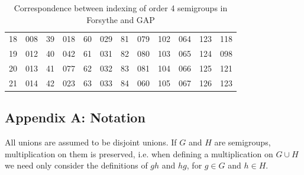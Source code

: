\documentclass{article}
\theoremstyle{plain}
\theoremstyle{definition}
\begin{document}
\begin{table}[h!]
\begin{center}
\begin{tabular}{cc|cc|cc|cc|cc|cc}
18  & 008      & 39  & 018  & 60  & 029  & 81  & 079 & 102 & 064  & 123 & 118 \\
19  & 012      & 40  & 042  & 61  & 031  & 82  & 080 & 103 & 065  & 124 & 098  \\
20  & 013      & 41  & 077  & 62  & 032  & 83  & 081 & 104 & 066  & 125 & 121 \\
21  & 014      & 42  & 023  & 63  & 033  & 84  & 060 & 105 & 067  & 126 & 123
\end{tabular}
\end{center}
\caption{Correspondence between indexing of order 4 semigroups in Forsythe \cite{Forsythe} and GAP}
\label{apx:A}
\end{table}

\subsection*{Appendix A: \quad Notation}\label{appB}
All unions are assumed to be disjoint unions. If $G$ and $H$ are semigroups, multiplication on them is preserved, i.e. when defining a multiplication on $G\cup H$ we need only consider the definitions of $gh$ and $hg$, for $g\in G$ and $h\in H$.\\ 
\end{document}
